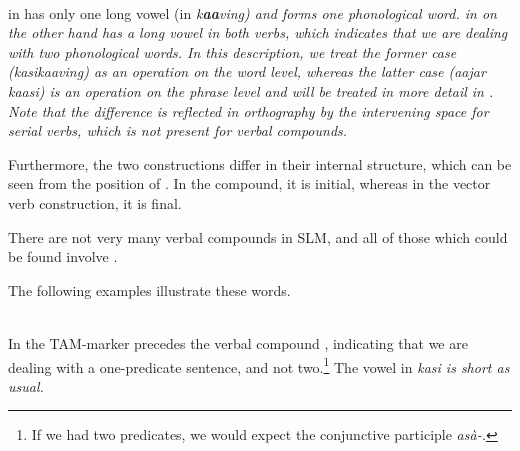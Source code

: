  \\
 in  has only one long vowel (in \em k\textbf{aa}ving\em) and forms one phonological word.  in  on the other hand has a long vowel in both verbs, which indicates that we are dealing with two phonological words. In this description, we treat the former case (\em kasikaaving\em) as an operation on the word level, whereas the latter case (\em aajar kaasi\em) is an operation on the phrase level and will be treated in more detail in . Note that the difference is reflected in orthography by the intervening space for serial verbs, which is not present for verbal compounds.

Furthermore, the two constructions differ in their internal structure, which can be seen from the position of . In the compound, it is initial, whereas in the vector verb construction, it is final.

There are not very many verbal compounds in SLM, and all of those which could be found involve .

The following examples illustrate these words.

\\

In  the TAM-marker precedes the verbal compound , indicating that we are dealing with a one-predicate sentence, and not two.\footnote{If we had two predicates, we would expect the conjunctive participle \em asà-\em {}.}
 The vowel in \em kasi \em is short as usual.



